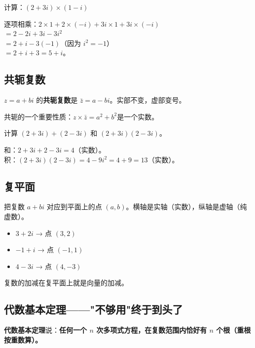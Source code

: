 \begin{example}
计算：$(2+3i)\times(1-i)$
\end{example}
\begin{solution}
逐项相乘：$2\times1 + 2\times(-i) + 3i\times 1 + 3i\times(-i)$\\
$= 2 - 2i + 3i - 3i^2$\\
$= 2 + i - 3(-1)$（因为 $i^2=-1$）\\
$= 2 + i + 3 = 5 + i$。
\end{solution}

\subsection*{共轭复数}

$z = a+bi$ 的\textbf{共轭复数}是 $\bar{z} = a-bi$。实部不变，虚部变号。

共轭的一个重要性质：$z \times \bar{z} = a^2 + b^2$是一个实数。

\begin{example}
计算 $(2+3i)+(2-3i)$ 和 $(2+3i)(2-3i)$。
\end{example}
\begin{solution}
和：$2+3i+2-3i = 4$（实数）。\\
积：$(2+3i)(2-3i) = 4 - 9i^2 = 4 + 9 = 13$（实数）。
\end{solution}

\subsection*{复平面}

把复数 $a+bi$ 对应到平面上的点 $(a,b)$。横轴是实轴（实数），纵轴是虚轴（纯虚数）。

\begin{itemize}
  \item $3+2i$ → 点 $(3,2)$
  \item $-1+i$ → 点 $(-1,1)$
  \item $4-3i$ → 点 $(4,-3)$
\end{itemize}

复数的加减在复平面上就是向量的加减。

\subsection*{代数基本定理——"不够用"终于到头了}

\textbf{代数基本定理}说：\textbf{任何一个 $n$ 次多项式方程，在复数范围内恰好有 $n$ 个根（重根按重数算）。}

